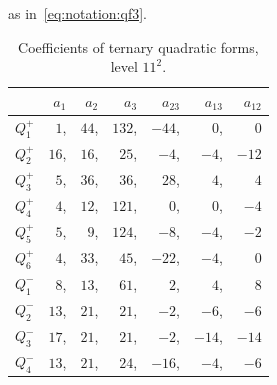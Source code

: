 as in~\eqref{eq:notation:qf3}.
\begin{table}
\begin{tabular}{|l|rrrrrr|}
\hline
 & $a_1$ & $a_2$ & $a_3$ & $a_{23}$ & $a_{13}$ & $a_{12}$ \\
\hline\hline
$Q_{1}^{+}$ & $1$,&$44$,&$132$,&$-44$,&$0$,&$0$ \\
$Q_{2}^{+}$ & $16$,&$16$,&$25$,&$-4$,&$-4$,&$-12$ \\
$Q_{3}^{+}$ & $5$,&$36$,&$36$,&$28$,&$4$,&$4$ \\
$Q_{4}^{+}$ & $4$,&$12$,&$121$,&$0$,&$0$,&$-4$ \\
$Q_{5}^{+}$ & $5$,&$9$,&$124$,&$-8$,&$-4$,&$-2$ \\
$Q_{6}^{+}$ & $4$,&$33$,&$45$,&$-22$,&$-4$,&$0$ \\
\hline
$Q_{1}^{-}$ & $8$,&$13$,&$61$,&$2$,&$4$,&$8$ \\
$Q_{2}^{-}$ & $13$,&$21$,&$21$,&$-2$,&$-6$,&$-6$ \\
$Q_{3}^{-}$ & $17$,&$21$,&$21$,&$-2$,&$-14$,&$-14$ \\
$Q_{4}^{-}$ & $13$,&$21$,&$24$,&$-16$,&$-4$,&$-6$ \\
\hline
\end{tabular}
\caption{Coefficients of ternary quadratic forms, level $11^2$.
          \label{table:qf3:11}}
\end{table}
